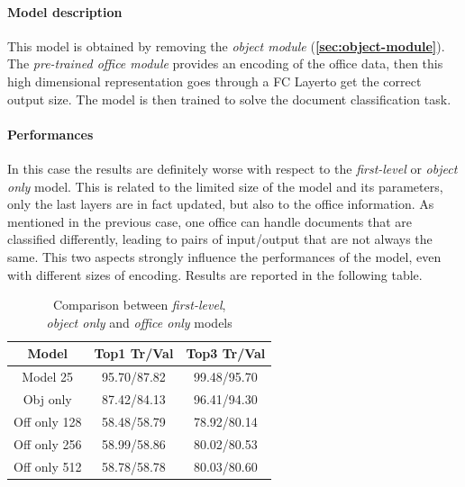 \documentclass[12pt]{article}
\begin{document}
\paragraph{Model description}
This model is obtained by removing the \textit{object module} (\textbf{\ref{sec:object-module}}). The \textit{pre-trained office module} provides an encoding of the office data, then this high dimensional representation goes through a FC Layer to get the correct output size. The model is then trained to solve the document classification task.
\paragraph{Performances}
In this case the results are definitely worse with respect to the \textit{first-level} or \textit{object only} model. This is related to the limited size of the model and its parameters, only the last layers are in fact updated, but also to the office information. As mentioned in the previous case, one office can handle documents that are classified differently, leading to pairs of input/output that are not always the same. This two aspects strongly influence the performances of the model, even with different sizes of encoding. Results are reported in the following table.
\begin{table}[ht!]
    \begin{adjustwidth}{}{}
	    \centering
	    \small
	    \begin{tabular}{ |c|c|c| }
        \hline
        \textbf{Model} & \textbf{Top1 Tr/Val} & \textbf{Top3 Tr/Val}\\
        \hline
        Model 25 & 95.70/87.82 & 99.48/95.70 \\
        Obj only & 87.42/84.13 & 96.41/94.30 \\
        Off only 128 & 58.48/58.79 & 78.92/80.14 \\
        Off only 256 & 58.99/58.86 & 80.02/80.53 \\
        Off only 512 & 58.78/58.78 & 80.03/80.60 \\
        \hline
        \end{tabular}
	    \label{tb:relevant-off}
    \end{adjustwidth}
    \captionsetup{justification   = centering}
    \caption{Comparison between \textit{first-level}, \\\textit{object only} and \textit{office only} models}
\end{table}
\end{document}
